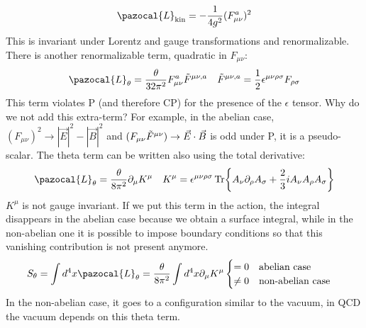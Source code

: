 \documentclass[../main.tex]{subfiles}
\begin{document}
\[
\pazocal{L}_{\text{kin}}=-\frac{1}{4g^2}(F_{\mu\nu}^a)^2
\]
This is invariant under Lorentz and gauge transformations and renormalizable. There is another renormalizable term, quadratic in $F_{\mu\nu}$:
\[
\pazocal{L}_{\theta}=\frac{\theta}{32\pi^2}F_{\mu\nu}^a\Tilde{F}^{\mu\nu,a} \quad \Tilde{F}^{\mu\nu,a}=\frac{1}{2}\epsilon^{\mu\nu\rho\sigma}F_{\rho\sigma}
\]
This term violates P (and therefore CP) for the presence of the $\epsilon$ tensor. Why do we not add this extra-term? For example, in the abelian case, $(F_{\mu\nu})^2\to|\vec{E}|^2-|\vec{B}|^2$ and $(F_{\mu\nu}\Tilde{F}^{\mu\nu})\to\vec{E}\cdot\vec{B}$ is odd under P, it is a pseudo-scalar. The theta term can be written also using the total derivative: 
\[
\pazocal{L}_{\theta}=\frac{\theta}{8\pi^2}\partial_\mu K^\mu \quad K^\mu=\epsilon^{\mu\nu\rho\sigma}\Tr{A_\nu\partial_\rho A_\sigma+\frac{2}{3}iA_\nu A_\rho A_\sigma}
\]
$K^\mu$ is not gauge invariant. If we put this term in the action, the integral disappears in the abelian case because we obtain a surface integral, while in the non-abelian one it is possible to impose boundary conditions so that this vanishing contribution is not present anymore.
\[
S_\theta=\int d^4x\pazocal{L}_\theta=\frac{\theta}{8\pi^2}\int d^4x\partial_\mu K^\mu\begin{cases}
    =0 \quad \text{abelian case}\\
    \neq0 \quad \text{non-abelian case}
\end{cases}
\]
In the non-abelian case, it goes to a configuration similar to the vacuum, in QCD the vacuum depends on this theta term.
\end{document}
